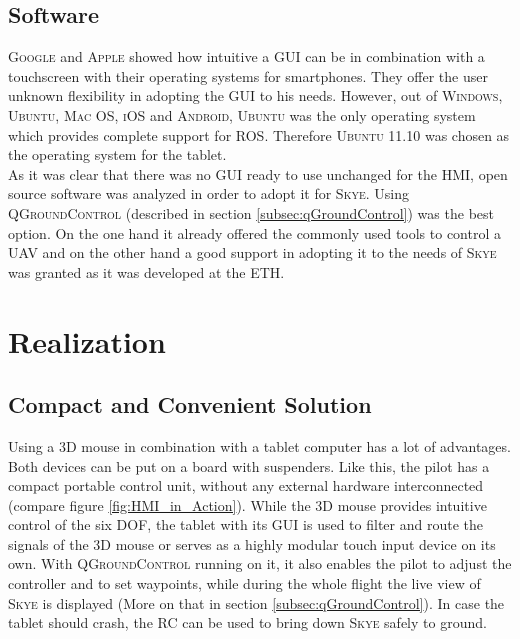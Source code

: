 \subsection{Software}
\textsc{Google} and \textsc{Apple} showed how intuitive a GUI can be in combination with a  touchscreen with their operating systems for smartphones. They offer the user unknown flexibility in adopting the GUI to his needs. However, out of \textsc{Windows}, \textsc{Ubuntu}, \textsc{Mac OS}, \textsc{iOS} and \textsc{Android}, \textsc{Ubuntu} was the only operating system which provides complete support for \textsc{ROS}. Therefore \textsc{Ubuntu 11.10} was chosen as the operating system for the tablet.\\
As it was clear that there was no GUI ready to use unchanged for the HMI, open source software was analyzed in order to adopt it for \textsc{Skye}. Using \textsc{QGroundControl} (described in section \ref{subsec:qGroundControl}) was the best option. On the one hand it already offered the commonly used tools to control a UAV and on the other hand a good support in adopting it to the needs of \textsc{Skye} was granted as it was developed at the \textsc{ETH}.


\section{Realization}
\label{sec:realization}

\subsection{Compact and Convenient Solution}
Using a 3D mouse in combination with a tablet computer has a lot of advantages. Both devices can be put on a board with suspenders. Like this, the pilot has a compact portable control unit, without any external hardware interconnected (compare figure \ref{fig:HMI_in_Action}). While the 3D mouse provides intuitive control of the six DOF, the tablet with its GUI is used to filter and route the signals of the 3D mouse or serves as a highly modular touch input device on its own. With \textsc{QGroundControl} running on it, it also enables the pilot to adjust the controller and to set waypoints, while during the whole flight the live view of \textsc{Skye} is displayed (More on that in section \ref{subsec:qGroundControl}). In case the tablet should crash, the RC can be used to bring down \textsc{Skye} safely to ground.

